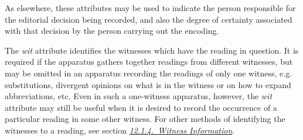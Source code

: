 As elsewhere, these attributes may be used to indicate the person responsible for the editorial decision being recorded, and also the degree of certainty associated with that decision by the person carrying out the encoding.\par
The {\itshape wit} attribute identifies the witnesses which have the reading in question. It is required if the apparatus gathers together readings from different witnesses, but may be omitted in an apparatus recording the readings of only one witness, e.g. substitutions, divergent opinions on what is in the witness or on how to expand abbreviations, etc. Even in such a one-witness apparatus, however, the {\itshape wit} attribute may still be useful when it is desired to record the occurrence of a particular reading in some other witness. For other methods of identifying the witnesses to a reading, see section \textit{\hyperref[TCAPLW]{12.1.4.\ Witness Information}}.\par
